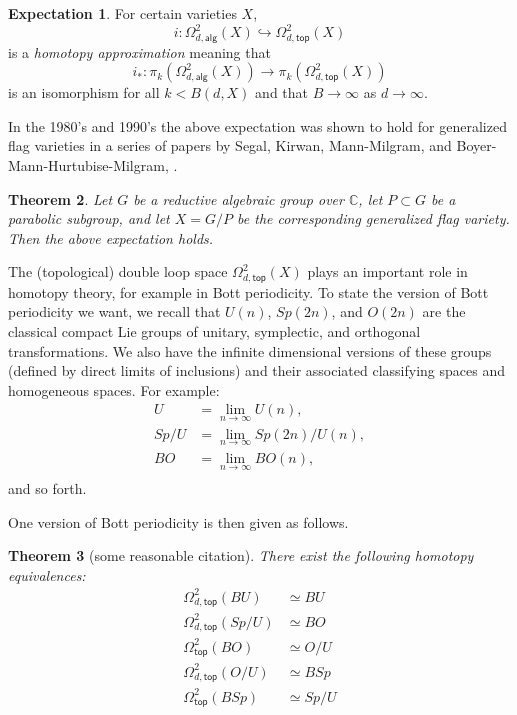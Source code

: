 \documentclass{amsart}
\newtheorem{theorem}{Theorem}[section]
\theoremstyle{definition}
\newtheorem{expectation}[theorem]{Expectation}
\newcommand{\CC} {{\mathbb C}}          %
\newcommand{\alg}{\mathsf{alg}}
\renewcommand{\top}{\mathsf{top}}
\newcommand{\LoopTwo}{\Omega^{2}_{d,\alg}}
\newcommand{\LoopTwoTop}{\Omega^{2}_{d,\top}}
\newcommand{\NoDLoopTwoTop}{\Omega^{2}_{\top}}
\newcommand{\homotopyeq}{\simeq}
\begin{document}
\begin{expectation}
For certain varieties $X$, 
\[
i:\LoopTwo (X) \hookrightarrow \LoopTwoTop
(X)
\]
is a \emph{homotopy approximation} meaning that 
\[
i_{*}:\pi_{k}(\LoopTwo (X)) \to \pi_{k}( \LoopTwoTop (X))
\]
is an isomorphism for all $k<B(d,X)$ and that $B\to \infty $ as $d\to
\infty$. 
\end{expectation}

In the 1980's and 1990's the above expectation was shown to hold for
generalized flag varieties in a series of papers by Segal, Kirwan,
Mann-Milgram, and Boyer-Mann-Hurtubise-Milgram,
\cite{Segal-1979,Kirwan-1986,Mann-Milgram-93,Boyer-Mann-Hurtubise-Milgram}.

\begin{theorem}\label{thm: Mann-Milgram algebraic loop approximation
holds for generalized flag varieties}
Let $G$ be a reductive algebraic group over $\CC$, let $P\subset G$
be a parabolic subgroup, and let $X=G/P$ be the corresponding
generalized flag variety. Then the above expectation holds.
\end{theorem}

The (topological) double loop space $\LoopTwoTop (X)$ plays an
important role in homotopy theory, for example in Bott periodicity. To
state the version of Bott periodicity we want, we recall that $U(n)$,
$Sp(2n)$, and $O(2n)$ are the classical compact Lie groups of unitary,
symplectic, and orthogonal transformations. We also have the infinite
dimensional versions of these groups (defined by direct limits of
inclusions) and their associated classifying spaces and homogeneous
spaces. For example:
\begin{align*}
U&=\lim_{n\to  \infty} U(n),\\
Sp/U& = \lim_{n\to  \infty} Sp(2n)/U(n),\\
BO& = \lim_{n\to  \infty} BO(n),\\
\end{align*}
and so forth.

One version of Bott periodicity is then given as follows.

\begin{theorem}[{\color{red}some reasonable citation}]\label{thm: classical Bott periodicity as homotopy equivalences}
There exist the following homotopy equivalences:
\begin{align}
\LoopTwoTop (BU)&\homotopyeq BU \label{eqn: Omega2BU=BU}\\
\LoopTwoTop (Sp/U)&\homotopyeq BO  \label{eqn: Omega2Sp/U=BO}\\
\NoDLoopTwoTop (BO)&\homotopyeq O/U  \label{eqn: Omega2BO=O/U}\\
\LoopTwoTop (O/U)&\homotopyeq BSp  \label{eqn: Omega2O/U=BSp}\\
\NoDLoopTwoTop (BSp)&\homotopyeq Sp/U   \label{eqn: Omega2BSp=Sp/U}
\end{align}
\end{theorem}
\end{document}
